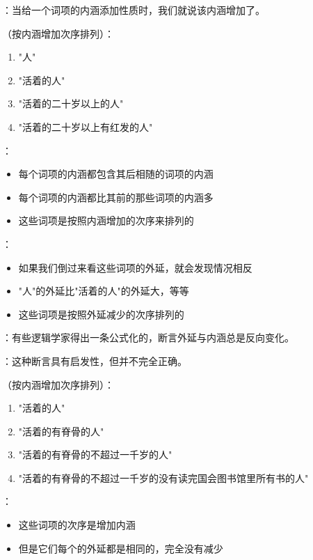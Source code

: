 \begin{theorembox}[title=内涵增加的定义]
：当给一个词项的内涵添加性质时，我们就说该内涵增加了。
\end{theorembox}

\begin{examplebox}[title=内涵与外延反变关系的典型例子]
（按内涵增加次序排列）：
\begin{enumerate}
  \item "人"
  \item "活着的人"
  \item "活着的二十岁以上的人"
  \item "活着的二十岁以上有红发的人"
\end{enumerate}

：
\begin{itemize}
  \item 每个词项的内涵都包含其后相随的词项的内涵
  \item 每个词项的内涵都比其前的那些词项的内涵多
  \item 这些词项是按照内涵增加的次序来排列的
\end{itemize}

：
\begin{itemize}
  \item 如果我们倒过来看这些词项的外延，就会发现情况相反
  \item "人"的外延比"活着的人"的外延大，等等
  \item 这些词项是按照外延减少的次序排列的
\end{itemize}
\end{examplebox}

\begin{theorembox}[title=反变规律的修正]
：有些逻辑学家得出一条公式化的，断言外延与内涵总是反向变化。

：这种断言具有启发性，但并不完全正确。
\end{theorembox}

\begin{examplebox}[title=反变规律的反例]
（按内涵增加次序排列）：
\begin{enumerate}
  \item "活着的人"
  \item "活着的有脊骨的人"
  \item "活着的有脊骨的不超过一千岁的人"
  \item "活着的有脊骨的不超过一千岁的没有读完国会图书馆里所有书的人"
\end{enumerate}

：
\begin{itemize}
  \item 这些词项的次序是增加内涵
  \item 但是它们每个的外延都是相同的，完全没有减少
\end{itemize}
\end{examplebox}


